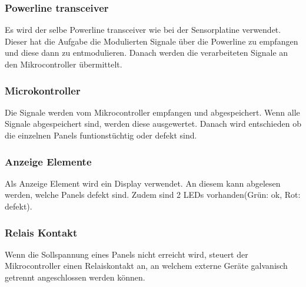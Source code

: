\subsubsection{Powerline transceiver}
Es wird der selbe Powerline transceiver wie bei der Sensorplatine verwendet. Dieser hat die Aufgabe die Modulierten Signale über die Powerline zu empfangen und diese dann zu entmodulieren. Danach werden die verarbeiteten Signale an den Mikrocontroller übermittelt.

\subsubsection{Microkontroller}
Die Signale werden vom Mikrocontroller empfangen und abgespeichert. Wenn alle Signale abgespeichert sind, werden diese ausgewertet. Danach wird entschieden ob die einzelnen Panels funtionstüchtig oder defekt sind.

\subsubsection{Anzeige Elemente}
Als Anzeige Element wird ein Display verwendet. An diesem kann abgelesen werden, welche Panels defekt sind. Zudem sind 2 LEDs vorhanden(Grün: ok, Rot: defekt).

\subsubsection{Relais Kontakt}
Wenn die Sollspannung eines Panels nicht erreicht wird, steuert der Mikrocontroller einen Relaiskontakt an, an welchem externe Geräte galvanisch getrennt angeschlossen werden können.

%
